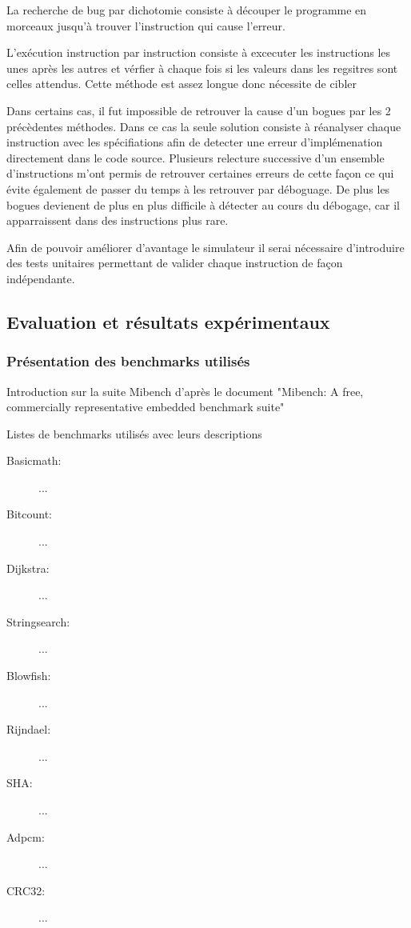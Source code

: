 La recherche de bug par dichotomie consiste à découper le programme en morceaux jusqu'à trouver l'instruction qui cause l'erreur.

L'exécution instruction par instruction consiste à excecuter les instructions les unes après les autres et vérfier à chaque fois si les valeurs dans les regsitres
sont celles attendus. Cette méthode est assez longue donc nécessite de cibler 

Dans certains cas, il fut impossible de retrouver la cause d'un bogues par les 2 précèdentes méthodes. 
Dans ce cas la seule solution consiste à réanalyser chaque instruction avec les spécifiations afin de detecter une erreur d'implémenation directement dans le code source.
Plusieurs relecture successive d'un ensemble d'instructions m'ont permis de retrouver certaines erreurs de cette façon ce qui évite également de passer du temps à les retrouver par déboguage.
De plus les bogues devienent de plus en plus difficile à détecter au cours du débogage, car il apparraissent dans des instructions plus rare. 

Afin de pouvoir améliorer d'avantage le simulateur il serai nécessaire d'introduire des tests unitaires permettant de valider chaque instruction de façon indépendante.

\subsection{Evaluation et résultats expérimentaux}

\subsubsection{Présentation des benchmarks utilisés}

Introduction sur la suite Mibench d'après le document "Mibench: A free, commercially representative embedded benchmark suite"

Listes de benchmarks utilisés avec leurs descriptions

\begin{description}
\item [Basicmath:]...
\item [Bitcount:]...
\item [Dijkstra:]...
\item [Stringsearch:]...
\item [Blowfish:]...
\item [Rijndael:]...
\item [SHA:]...
\item [Adpcm:]...
\item [CRC32:]...
\end{description}

